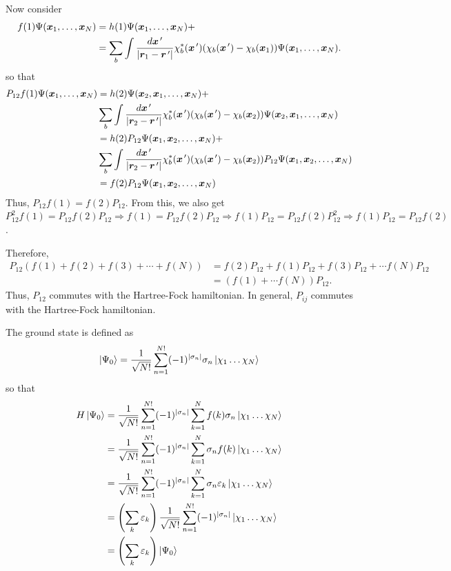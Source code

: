 \begin{enumerate}
Now consider
\[
\begin{aligned}
f(1)\Psi(\bm{x}_1, \ldots, \bm{x}_N) &= h(1)\Psi(\bm{x}_1, \ldots,
\bm{x}_N) + \\
 &= \sum_b\int \frac{d\bm{x}^{\,\prime}}{|\bm{r}_1 - \bm{r}^{\,\prime}|}\chi_b^\ast(\bm{x}^{\,\prime})
 (\chi_b(\bm{x}^{\,\prime}) - \chi_b(\bm{x}_1))\Psi(\bm{x}_1, \ldots, \bm{x}_N).
\end{aligned}
\]
so that
\[
\begin{aligned}
P_{12}f(1)\Psi(\bm{x}_1, \ldots, \bm{x}_N) &= h(2)\Psi(\bm{x}_2, \bm{x}_1,
\ldots, \bm{x}_N) + \\
 & \sum_b\int\frac{d\bm{x}^{\,\prime}}{|\bm{r}_2 -
 \bm{r}^{\,\prime}|}\chi_b^\ast(\bm{x}^{\,\prime})(\chi_b(\bm{x}^{\,\prime}) - \chi_b(\bm{x}_2))
 \Psi(\bm{x}_2, \bm{x}_1, \ldots, \bm{x}_N) \\
 &= h(2)P_{12}\Psi(\bm{x}_1, \bm{x}_2, \ldots, \bm{x}_N) + \\
 & \sum_b\int\frac{d\bm{x}^{\,\prime}}{|\bm{r}_2 -
 \bm{r}^{\,\prime}|}\chi_b^\ast(\bm{x}^{\,\prime})(\chi_b(\bm{x}^{\,\prime}) - \chi_b(\bm{x}_2))
 P_{12}\Psi(\bm{x}_1, \bm{x}_2, \ldots, \bm{x}_N) \\
 &= f(2)P_{12}\Psi(\bm{x}_1, \bm{x}_2, \ldots, \bm{x}_N) 
\end{aligned}
\]
Thus, $P_{12}f(1) = f(2)P_{12}$. From this, we also get $P_{12}^2 f(1) =
P_{12}f(2)P_{12} \Rightarrow f(1) = P_{12}f(2)P_{12} \Rightarrow f(1)P_{12} =
P_{12}f(2)P_{12}^2 \Rightarrow f(1)P_{12} = P_{12}f(2)$.

Therefore,
\[
\begin{aligned}
P_{12}(f(1) + f(2) + f(3) + \cdots + f(N)) &= f(2)P_{12} + f(1)P_{12} +
f(3)P_{12} + \cdots f(N)P_{12} \\
&= (f(1) + \cdots f(N))P_{12}.
\end{aligned}
\]
Thus, $P_{12}$ commutes with the Hartree-Fock hamiltonian. In general, $P_{ij}$
commutes with the Hartree-Fock hamiltonian.

The ground state is defined as
\[
\ket{\Psi_0} = \frac{1}{\sqrt{N!}}\sum_{n=1}^{N!}(-1)^{|\sigma_n|}\sigma_n
\ket{\chi_1\ldots\chi_N}
\]
so that
\[
\begin{aligned}
H\ket{\Psi_0} &=
\frac{1}{\sqrt{N!}}\sum_{n=1}^{N!}(-1)^{|\sigma_n|}\sum_{k=1}^N f(k)\sigma_n
\ket{\chi_1\ldots\chi_N} \\
&= \frac{1}{\sqrt{N!}}\sum_{n=1}^{N!}(-1)^{|\sigma_n|}\sum_{k=1}^N\sigma_n f(k)
\ket{\chi_1\ldots\chi_N} \\
&= \frac{1}{\sqrt{N!}}\sum_{n=1}^{N!}(-1)^{|\sigma_n|}\sum_{k=1}^N\sigma_n
\varepsilon_k \ket{\chi_1\ldots\chi_N} \\
&= \left(\sum_k\varepsilon_k\right)\frac{1}{\sqrt{N!}}\sum_{n=1}^{N!}
(-1)^{|\sigma_n|}\ket{\chi_1\ldots\chi_N} \\
&= \left(\sum_k\varepsilon_k\right)\ket{\Psi_0}
\end{aligned}
\]

\end{enumerate}
